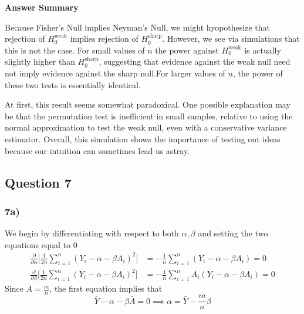 \documentclass[
  11pt,
  letterpaper,
  DIV=11,
  numbers=noendperiod]{scrartcl}
\begin{document}
\begin{tcolorbox}[enhanced jigsaw, arc=.35mm, colback=white, bottomrule=.15mm, breakable, opacityback=0, rightrule=.15mm, toprule=.15mm, leftrule=.75mm, left=2mm, colframe=quarto-callout-note-color-frame]

\textbf{Answer Summary}\vspace{2mm}

Because Fisher's Null implies Neyman's Null, we might hyopothesize that
rejection of \(H_0^\text{weak}\) implies rejection of
\(H_0^\text{sharp}\). However, we see via simulations that this is not
the case. For small values of \(n\) the power against
\(H_0^\text{weak}\) is actually slightly higher than
\(H_0^\text{sharp}\), suggesting that evidence against the weak null
need not imply evidence against the sharp null.For larger values of
\(n\), the power of these two tests is essentially identical.

At first, this result seems somewhat paradoxical. One possible
explanation may be that the permutation test is inefficient in small
samples, relative to using the normal approximation to test the weak
null, even with a conservative variance estimator. Overall, this
simulation shows the importance of testing out ideas because our
intuition can sometimes lead us astray.

\end{tcolorbox}

\hypertarget{question-7}{%
\subsection{Question 7}\label{question-7}}

\hypertarget{a-2}{%
\subsubsection{7a)}\label{a-2}}

We begin by differentiating with respect to both \(\alpha, \beta\) and
setting the two equations equal to 0 \[
\begin{aligned}
\frac{\partial}{\partial\alpha}\biggr[\frac{1}{2n}\sum_{i = 1}^n (Y_i - \alpha - \beta A_i)^2\biggr] &= -\frac{1}{n}\sum_{i = 1}^n(Y_i - \alpha - \beta A_i) = 0 \\
\frac{\partial}{\partial\beta}\biggr[\frac{1}{2n}\sum_{i = 1}^n(Y_i - \alpha - \beta A_i)^2\biggr] &= -\frac{1}{n}\sum_{i = 1}^n A_i(Y_i - \alpha - \beta A_i) = 0
\end{aligned}
\] Since \(\bar A = \frac{m}{n}\), the first equation implies that \[
\bar Y - \alpha - \beta\bar A = 0 \implies \alpha = \bar Y - \frac{m}{n}\beta
\]
\end{document}
